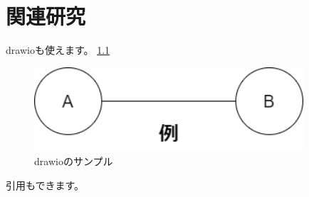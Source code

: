 \chapter{関連研究}
drawioも使えます。
\ref{drawioのサンプル}

\begin{figure}[H]
    \centering
    \includegraphics[width=10cm]{images/model.drawio.png}
    \caption{drawioのサンプル}
    \label{drawioのサンプル}
\end{figure}

引用もできます。
\cite{bakabon}
